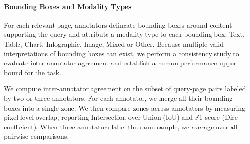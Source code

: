 

\paragraph{Bounding Boxes and Modality Types}
For each relevant page, annotators delineate bounding boxes around content supporting the query and attribute a modality type to each bounding box: Text, Table, Chart, Infographic, Image, Mixed or Other. 
Because multiple valid interpretations of bounding boxes can exist, we perform a consistency study to evaluate inter-annotator agreement and establish a human performance upper bound for the task.

We compute inter-annotator agreement on the subset of query-page pairs labeled by two or three annotators. For each annotator, we merge all their bounding boxes into a single zone. We then compare zones across annotators by measuring pixel-level overlap, reporting Intersection over Union (IoU) and F1 score (Dice coefficient). When three annotators label the same sample, we average over all pairwise comparisons.

